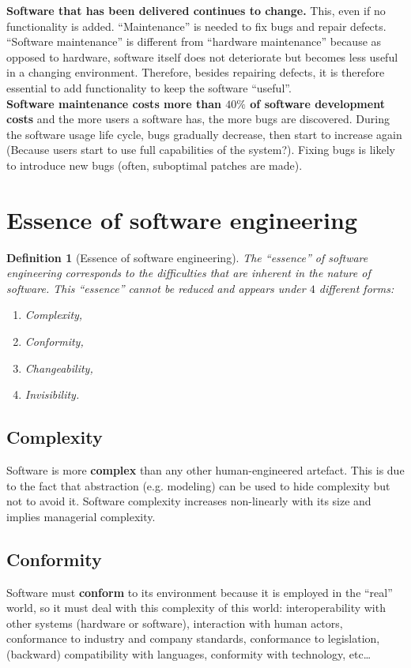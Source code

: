 \documentclass[a4paper,11pt]{report}
\newtheorem{definition}{Definition}
\begin{document}
\textbf{Software that has been delivered continues to change.} This, even if no
functionality is added. ``Maintenance'' is needed to fix bugs and repair
defects. ``Software maintenance'' is different from ``hardware maintenance''
because as opposed to hardware, software itself does not deteriorate but becomes
less useful in a changing environment. Therefore, besides repairing defects, it
is therefore essential to add functionality to keep the software ``useful''.\\

\textbf{Software maintenance costs more than $40\%$ of software development
costs} and the more users a software has, the more bugs are discovered. During
the software usage life cycle, bugs gradually decrease, then start to increase
again (Because users start to use full capabilities of the system?). Fixing bugs
is likely to introduce new bugs (often, suboptimal patches are made).

\clearpage
\section{Essence of software engineering}

\begin{definition}[Essence of software engineering]
The ``essence'' of software engineering corresponds to the difficulties that are
inherent in the nature of software. This ``essence'' cannot be reduced and
appears under $4$ different forms:
\begin{enumerate}
\item Complexity,
\item Conformity,
\item Changeability,
\item Invisibility.
\end{enumerate}
\end{definition}

\subsection{Complexity}
Software is more \textbf{complex} than any other human-engineered artefact.
This is due to the fact that abstraction (e.g. modeling) can be used to hide
complexity but not to avoid it. Software complexity increases non-linearly with
its size and implies managerial complexity.

\subsection{Conformity}
Software must \textbf{conform} to its environment because it is employed in the
``real'' world, so it must deal with this complexity of this world:
interoperability with other systems (hardware or software), interaction with
human actors, conformance to industry and company standards, conformance to
legislation, (backward) compatibility with languages, conformity with
technology, etc\dots
\end{document}
